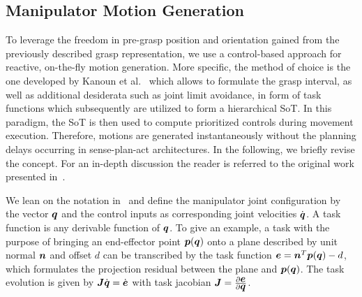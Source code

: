 \subsection{Manipulator Motion Generation}
\label{subsec:manip_motion}
%
To leverage the freedom in pre-grasp position and orientation gained from the previously described
grasp representation, we use a control-based approach for reactive, on-the-fly motion
generation. More specific, the method of choice is the one developed by Kanoun et al.~\cite{Kano11}
which allows to formulate the grasp interval, as well as additional desiderata such as joint limit
avoidance, in form of task functions which subsequently are utilized to form a hierarchical SoT. In
this paradigm, the SoT is then used to compute prioritized controls during movement
execution. Therefore, motions are generated instantaneously without the planning delays occurring in
sense-plan-act architectures. In the following, we briefly revise the concept. For an in-depth
discussion the reader is referred to the original work presented in~\cite{Kano11}.

We lean on the notation in~\cite{Esca14} and define the manipulator joint configuration by the
vector $\mbox{\boldmath $q$}$ and the control inputs as corresponding joint velocities $\dot{\mbox{\boldmath $q$}}$. A task
function is any derivable function of $\mbox{\boldmath $q$}$. To give an example, a task with the purpose of
bringing an end-effector point $\mbox{\boldmath $p$}(\mbox{\boldmath $q$})$ onto a plane described by unit normal $\mbox{\boldmath $n$}$
and offset $d$ can be transcribed by the task function $\mbox{\boldmath $e$}=\mbox{\boldmath $n$}^T\mbox{\boldmath $p$}(\mbox{\boldmath $q$})-d$, which
formulates the projection residual between the plane and $\mbox{\boldmath $p$}(\mbox{\boldmath $q$})$. The task evolution is
given by $\mbox{\boldmath $J$}\dot{\mbox{\boldmath $q$}}=\dot{\mbox{\boldmath $e$}}$ with task jacobian
$\mbox{\boldmath $J$}=\frac{\partial\mbox{\boldmath $e$}}{\partial\mbox{\boldmath $q$}}$.

